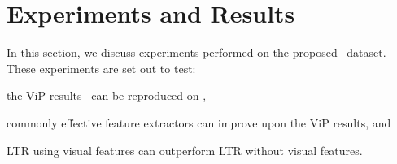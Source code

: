 
%



\section{Experiments and Results}
In this section, we discuss experiments performed on the proposed \datasetname~dataset.
These experiments are set out to test:

\begin{inparaenum}[(i)]
\item the ViP results~\cite{fan2017learning} can be reproduced on \datasetname, 
\item commonly effective feature extractors can improve upon the ViP results, and
\item \ac{LTR} using visual features can outperform \ac{LTR} without visual features. 
\end{inparaenum}

